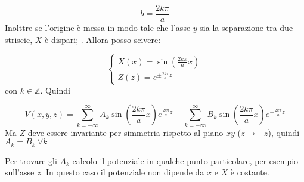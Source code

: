 \documentclass[../main.tex]{subfiles}
\begin{document}
\begin{equation}
  b=\frac{2k \pi}{a}
\end{equation}
Inolttre se l'origine \`e messa in modo tale che l'asse $y$ sia la separazione tra due striscie, $X$ \`e dispari; . Allora posso scivere:

\begin{equation}
  \left\{
    \begin{aligned}
      X(x)=\sin \left(\frac{2 k \pi}{a}x \right) \\
      Z(z)=e^{\pm \frac{2 k \pi}{a}z}
    \end{aligned}
  \right.
\end{equation}
con $k\in \mathbb Z$. Quindi

\begin{equation}
  V(x,y,z)=\sum_{k=-\infty}^\infty A_k \sin \left(\frac{2 k \pi}{a}x \right) e^{\frac{2 k \pi}{a} z } + \sum_{k=-\infty}^\infty B_k \sin \left(\frac{2 k \pi}{a}x \right) e^{- \frac{2 k \pi}{a} z }
\end{equation}
Ma $Z$ deve essere invariante per simmetria rispetto al piano $xy$ ($z \to -z$), quindi $A_k=B_k \ \forall k$


Per trovare gli $A_k$ calcolo il potenziale in qualche punto particolare, per esempio sull'asse $z$.
In questo caso il potenziale non dipende da $x$ e $X$ \`e costante.
\end{document}

